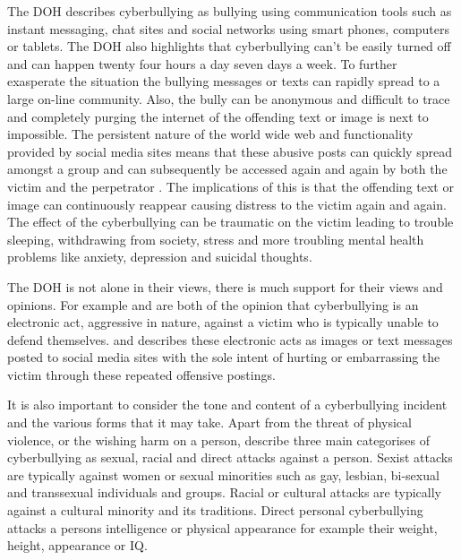 The DOH describes cyberbullying as bullying using communication tools such as instant messaging, chat sites and social networks using smart phones, computers or tablets. The DOH also highlights that cyberbullying can't be easily turned off and can happen twenty four hours a day seven days a week. To further exasperate the situation the bullying messages or texts can rapidly spread to a large on-line community. Also, the bully can be anonymous and difficult to trace and completely purging the internet of the offending text or image is next to impossible. The persistent nature of the world wide web and functionality provided by social media sites means that these abusive posts can quickly spread amongst a group and can subsequently be accessed again and again by both the victim and the perpetrator \cite{dadvar_improved_2012} \cite{nahar_effective_2013} \cite{dadvar_towards_2012}. The implications of this is that the offending text or image can continuously reappear causing distress to the victim again and again. The effect of the cyberbullying can be traumatic on the victim leading to trouble sleeping, withdrawing from society, stress and more troubling mental health problems like anxiety, depression and suicidal thoughts. 

The DOH is not alone in their views, there is much support for their views and opinions. For example \citet{dadvar_improving_2013} and \citet{nahar_effective_2013} are both of the opinion that cyberbullying is an electronic act, aggressive in nature, against a victim who is typically unable to defend themselves. \citet{dinakar_modeling_2011} and \citet{rybnicek_facebook_2013} describes these electronic acts as images or text messages posted to social media sites with the sole intent of hurting or embarrassing the victim through these repeated offensive postings. 

It is also important to consider the tone and content of a cyberbullying incident and the various forms that it may take. Apart from the threat of physical violence, or the wishing harm on a person,  \citet{dinakar_common_2012} describe three main categorises of cyberbullying as sexual, racial and direct attacks against a person. Sexist attacks are typically against women or sexual minorities such as gay, lesbian, bi-sexual and transsexual individuals and groups. Racial or cultural attacks are typically against a cultural minority and its traditions. Direct personal cyberbullying attacks a persons intelligence or physical appearance for example their weight, height, appearance or IQ. 

